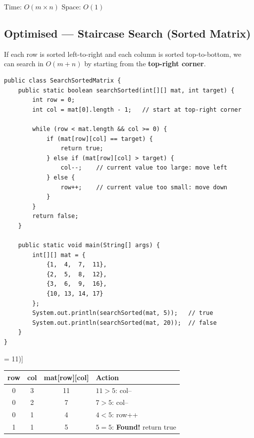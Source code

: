 \documentclass[12pt,a4paper,oneside]{book}
\begin{document}
\begin{complexity}
Time: $O(m \times n)$ \quad Space: $O(1)$
\end{complexity}

\subsection{Optimised --- Staircase Search (Sorted Matrix)}

If each row is sorted left-to-right and each column is sorted top-to-bottom, we can search in $O(m + n)$ by starting from the \textbf{top-right corner}.

\begin{lstlisting}[caption={Search in Row-Column Sorted Matrix --- O(m+n)}]
public class SearchSortedMatrix {
    public static boolean searchSorted(int[][] mat, int target) {
        int row = 0;
        int col = mat[0].length - 1;   // start at top-right corner

        while (row < mat.length && col >= 0) {
            if (mat[row][col] == target) {
                return true;
            } else if (mat[row][col] > target) {
                col--;    // current value too large: move left
            } else {
                row++;    // current value too small: move down
            }
        }
        return false;
    }

    public static void main(String[] args) {
        int[][] mat = {
            {1,  4,  7,  11},
            {2,  5,  8,  12},
            {3,  6,  9,  16},
            {10, 13, 14, 17}
        };
        System.out.println(searchSorted(mat, 5));   // true
        System.out.println(searchSorted(mat, 20));  // false
    }
}
\end{lstlisting}

\begin{dryrun}[Searching for 5 in the matrix above (start top-right = mat[0][3] = 11)]
\begin{center}
\begin{tabular}{cccl}
\toprule
\textbf{row} & \textbf{col} & \textbf{mat[row][col]} & \textbf{Action}\\
\midrule
0 & 3 & 11 & $11 > 5$: col-- \\
0 & 2 & 7  & $7 > 5$: col--  \\
0 & 1 & 4  & $4 < 5$: row++  \\
1 & 1 & 5  & $5 = 5$: \textbf{Found!} return true\\
\bottomrule
\end{tabular}
\end{center}
\end{dryrun}
\end{document}
